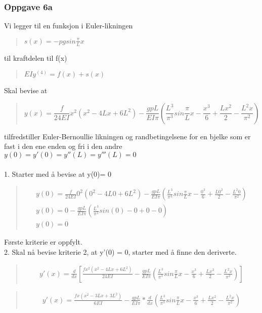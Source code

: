 \subsubsection{Oppgave 6a}
Vi legger til en funksjon i Euler-likningen
\begin{quote}
$s(x) = -pgsin\frac{\pi}{L} x $
\end{quote} 
til kraftdelen til f(x)
\begin{quote}
$EIy^{(4)} = f(x) + s(x)$
\end{quote}
Skal bevise at
\begin{quote}
\begin{equation}
y(x) = \frac{f}{24EI} x^2 (x^2 - 4Lx + 6L^2) - \frac{gpL}{EI\pi} (\frac{L^3}{\pi^3} sin\frac{\pi}{L}x - \frac{x^3}{6} + \frac{Lx^2}{2} - \frac{L^2 x}{\pi^2})
\end{equation}
\end{quote}
tilfredstiller Euler-Bernoullie likningen og randbetingelsene for en bjelke som er fast i den ene enden og fri i den andre\\
$y(0) = y'(0) = y''(L) = y'''(L) = 0$ \\
\\
1. Starter med å bevise at y(0)= 0
\begin{quote}
\begin{multline*}
y(0) = \frac{f}{24EI} 0^2 (0^2 - 4L0 + 6L^2) - \frac{gpL}{EI\pi} (\frac{L^3}{\pi^3} sin\frac{\pi}{L}x - \frac{0^3}{6} + \frac{L0^2}{2} - \frac{L^2 0}{\pi^2}) \\
y(0) = 0 - \frac{gpL}{EI\pi} (\frac{L^3}{\pi^3} sin (0) - 0 + 0 - 0 ) \\
y(0) = 0
\end{multline*}
\end{quote}
Første kriterie er oppfylt.
\\
2. Skal nå bevise kriterie 2, at y'(0) = 0, starter med å finne den deriverte.
\begin{quote}
\begin{multline}
y'(x) = \frac{d}{dx} [\frac{fx^2(x^2-4Lx+6L^2)}{24EI} - \frac{gpL}{EI\pi} (\frac{L^3}{\pi^3} sin \frac{\pi}{L}x - \frac{x^3}{6} + \frac{Lx^2}{2} - \frac{L^2x}{\pi^2})]
\end{multline}
\end{quote}

\begin{quote}
\begin{multline*}
y'(x) = \frac{fx(x^2-3Lx+3L^2)}{6EI} - \frac{gpL}{EI\pi}*\frac{d}{dx} (\frac{L^3}{\pi^3} sin \frac{\pi}{L}x - \frac{x^3}{6} + \frac{Lx^2}{2} - \frac{L^2x}{\pi^2})
\end{multline*}
\end{quote}

